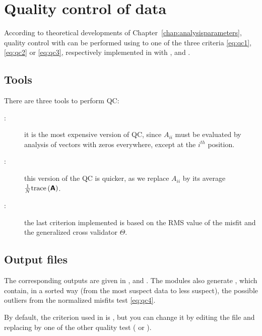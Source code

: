\section{Quality control of data}

According to theoretical developments of Chapter~\ref{chap:analysisparameters}, quality control with \diva can be performed using to one of the three criteria \eqref{eq:qc1}, \eqref{eq:qc2} or \eqref{eq:qc3}, respectively implemented in \diva with ,  and . 



\subsection{Tools}

There are three tools to perform QC:
\begin{description}
\item[:] it is the most expensive version of QC, since $A_{ii}$ must be evaluated by analysis of vectors with zeros everywhere, except at the $i^{th}$ position.
\item[:] this version of the QC is quicker, as we replace $A_{ii}$ by its average $\frac{1}{N}\mathrm{trace}\left( \mbox{\boldmath $ \protect\mathsf{A} $} \right)$.
\item[:] the last criterion implemented is based on the RMS value of the misfit and the generalized cross validator $\Theta$. 
\end{description}

\subsection{Output files}

The corresponding outputs are given in ,  and .
The modules  also generate , which contain, in a sorted way (from the most suspect data to less suspect), the possible outliers from the normalized misfits test \eqref{eq:qc4}.

\btips
By default, the criterion used in  is , but you can change it by editing the file  and replacing  by one of the other quality test ( or ).
\etips


